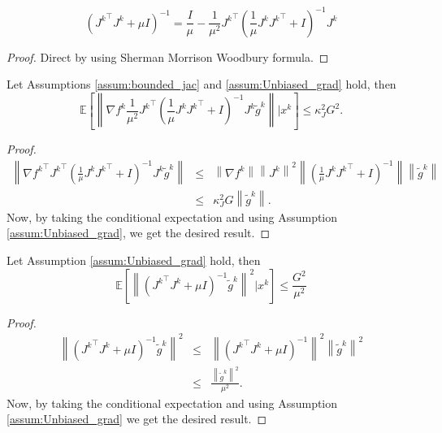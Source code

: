 \documentclass{article}
\newcommand{\E}{\mathbb{E}}
\begin{document}
\begin{lemma} \label{lem:smwf}
$$\left({J^k}^\top J^k + \mu I\right)^{-1} = \frac{I}{\mu} - \frac{1}{\mu^2} {J^k}^\top\left(\frac{1}{\mu }J^k {J^k}^\top  +  I\right)^{-1}J^k$$
\end{lemma}
\begin{proof}
Direct by using Sherman Morrison Woodbury formula.
\end{proof}
\begin{lemma}\label{lem:boundft} Let Assumptions \ref{assum:bounded_jac} and \ref{assum:Unbiased_grad} hold, then 
$$\E\left[\left\|\nabla f^k\frac{1}{\mu^2} {J^k}^\top\left(\frac{1}{\mu }J^k {J^k}^\top  +  I\right)^{-1}J^k \tilde{g}^k\right\| |x^k \right]\le \kappa_J^2 G^2.$$
\end{lemma}
\begin{proof}
\begin{eqnarray*}
\left\|{\nabla f^k}^\top {J^k}^\top\left(\frac{1}{\mu }J^k {J^k}^\top  +  I\right)^{-1}J^k \tilde{g}^k\right\|&\le& \left\|{\nabla f^k} \right\| \left\| {J^k}\right\|^2 \left\| \left(\frac{1}{\mu }J^k {J^k}^\top  +  I\right)^{-1} \right\| \left\|\tilde{g}^k\right\| \\
&\le & \kappa_J^2 G \left\|\tilde{g}^k\right\|.
\end{eqnarray*}
Now, by taking the conditional expectation and using Assumption \ref{assum:Unbiased_grad}, we get the desired result.
\end{proof}
\begin{lemma}\label{lem:boundst} Let Assumption \ref{assum:Unbiased_grad} hold, then 
$$\E\left[\left\|({J^k}^\top J^k + \mu I)^{-1} \tilde{g}^k\right\|^2 | x^k\right] \le \frac{ G^2}{\mu^2}$$
\end{lemma}
\begin{proof}
\begin{eqnarray*}
\left\|({J^k}^\top J^k + \mu I)^{-1} \tilde{g}^k\right\|^2 &\le&  \left\| ({J^k}^\top J^k + \mu I)^{-1} \right\|^2 \left\|\tilde{g}^k\right\|^2 \\
&\le & \frac{ \left\|\tilde{g}^k\right\|^2}{\mu^2}.
\end{eqnarray*}
Now, by taking the conditional expectation and using Assumption \ref{assum:Unbiased_grad} we get the desired result.
\end{proof}
\end{document}
